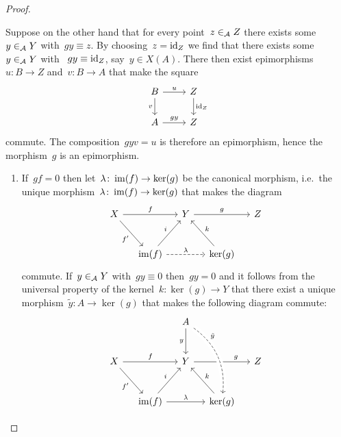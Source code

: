 \begin{proof}
\begin{enumerate}
      Suppose on the other hand that for every point~$z \in_{\mathcal{A}} Z$ there exists some~$y \in_{\mathcal{A}} Y$ with~$gy \equiv z$.
      By choosing~$z = \operatorname{id}_Z$ we find that there exists some~$y \in_{\mathcal{A}} Y$ with ~$gy \equiv \operatorname{id}_Z$, say~$y \in X(A)$.
      There then exist epimorphisms~$u \colon B \to Z$ and~$v \colon B \to A$ that make the square
      \[
        \begin{tikzcd}
            B
            \arrow{r}[above]{u}
            \arrow{d}[left]{v}
          & Z
            \arrow{d}[right]{\id_Z}
          \\
            A
            \arrow{r}[above]{gy}
          & Z
        \end{tikzcd}
      \]
      commute.
      The composition~$gyv = u$ is therefore an epimorphism, hence the morphism~$g$ is an epimorphism.
  \end{enumerate}
  
  
  
  
  
  
  
  
  
  
  \begin{enumerate}[resume]
    \item 
      If~$gf = 0$ then let~$\lambda \colon \operatorname{im}(f) \to \ker(g)$ be the canonical morphism, i.e.\ the unique morphism~$\lambda \colon \operatorname{im}(f) \to \ker(g)$ that makes the diagram
      \[
        \begin{tikzcd}[column sep = small, row sep = large]
            X
            \arrow{rr}[above]{f}
            \arrow{dr}[below left]{f'}
          & {}
          & Y
            \arrow{rr}[above]{g}
          & {}
          & Z
          \\
            {}
          & \im(f)
            \arrow{ur}[above left]{i}
            \arrow[dashed]{rr}[above]{\lambda}
          & {}
          & \ker(g)
            \arrow{ul}[above right]{k}
          & {}
        \end{tikzcd}
      \]
      commute.
      If~$y \in_{\mathcal{A}} Y$ with~$gy \equiv 0$ then~$gy = 0$ and it follows from the universal property of the kernel~$k \colon \ker(g) \to Y$ that there exist a unique morphism~$\tilde{y} \colon A \to \ker(g)$ that makes the following diagram commute:
      \[
        \begin{tikzcd}[column sep = small, row sep = large]
            {}
          & {}
          & A
            \arrow{d}[left]{y}
          & {}
          & {}
          \\
            X
            \arrow{rr}[above]{f}
            \arrow{dr}[below left]{f'}
          & {}
          & Y
            \arrow{rr}[above, near end]{g}
          & {}
          & Z
          \\
            {}
          & \im(f)
            \arrow{ur}[above left]{i}
            \arrow{rr}[above]{\lambda}
          & {}
          & \ker(g)
            \arrow[from = uul, dashed, bend left, crossing over, near start, "\tilde{y}"]
            \arrow{ul}[above right]{k}
          & {}
        \end{tikzcd}
      \]
      

\end{enumerate}
\end{proof}
